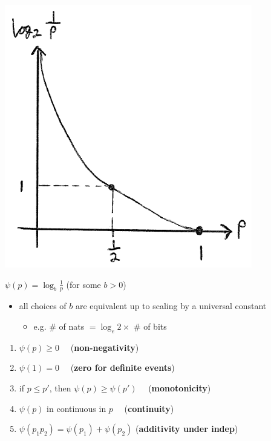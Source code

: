 \documentclass[10pt, landscape]{article}
\begin{document}
\begin{multicols*}{4}
  \begin{minipage}[c]{0.23\linewidth}
    \includegraphics[width=\linewidth]{cs3236-information-log2-p-graph.png} 
  \end{minipage}
  \begin{minipage}[c]{0.74\linewidth}\color{black}
    \begin{tightcenter}
      $ \psi(p) = \log_b \frac{1}{p} $ (for some $b>0$)
    \end{tightcenter}
    \begin{itemize}
      \item all choices of $b$ are equivalent up to scaling by a universal constant
        \begin{itemize}
          \item e.g. \# of nats $= \log_e 2 \times$ \# of bits
        \end{itemize}
    \end{itemize}
  \end{minipage}

  \begin{enumerate}
    \item $\psi(p) \geq 0\quad$ (\textbf{non-negativity}) 
    \item $\psi(1) = 0\quad$ (\textbf{zero for definite events}) 
    \item if $p \leq p'$, then $\psi(p) \geq \psi(p') \quad$ (\textbf{monotonicity})
    \item $\psi(p)$ in continuous in $p \quad$ (\textbf{continuity}) 
    \item $\psi(p_1 p_2) = \psi(p_1) + \psi(p_2)$
      (\textbf{additivity under indep})
  \end{enumerate}


\end{multicols*}
\end{document}
